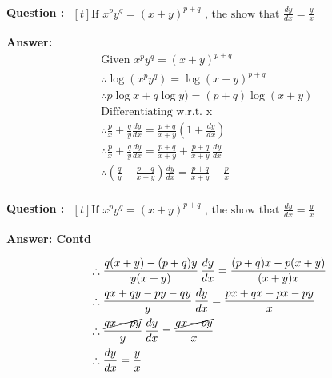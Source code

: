 \documentclass{beamer}
\begin{document}
\frame
{ \textbf{Question :} 
$\begin{aligned}[t] 
\text{If \ } x^p y^q = (x+y)^{p+q} \text{\ , \ the show that \ \  } \frac{dy}{dx}=\frac{y}{x}
\end{aligned}$

\textbf{Answer:}
\begin{equation} \nonumber
\begin{alignedat}{4}
& \text{Given \ } x^py^q = (x+y)^{p+q} \\
& \therefore \log (x^py^q) = \log (x+y)^{p+q} \\
& \therefore p\log x + q\log y) = (p+q)\log (x+y) \\
& \text{Differentiating w.r.t. x \ }\\
& \therefore \frac{p}{x}+\frac{q}{y}\frac{dy}{dx} = \frac{p+q}{x+y}\left( 1+\frac{dy}{dx}\right)\\
& \therefore \frac{p}{x}+\frac{q}{y}\frac{dy}{dx} = \frac{p+q}{x+y} + \frac{p+q}{x+y}\,\frac{dy}{dx}\\
& \therefore \left( \frac{q}{y}-\frac{p+q}{x+y} \right)  \frac{dy}{dx} = \frac{p+q}{x+y} - \frac{p}{x}\\
\end{alignedat}
\,
\begin{alignedat}{4}
\end{alignedat}
\end{equation}


}



\frame
{ \textbf{Question :} 
$\begin{aligned}[t] 
\text{If \ } x^p y^q = (x+y)^{p+q} \text{\ , \ the show that \ \  } \frac{dy}{dx}=\frac{y}{x}
\end{aligned}$

\textbf{Answer: Contd}

\begin{equation} \nonumber
\begin{alignedat}{4}
& \therefore \frac{q(x+y) - (p+q)y}{y(x+y)} \,  \frac{dy}{dx} = \frac{(p+q)x - p(x+y)}{(x+y)x}\\
& \therefore \frac{qx + qy - py - qy}{y} \,  \frac{dy}{dx} = \frac{px + qx - px - py}{x}\\
& \therefore \frac{\cancel{qx - py}}{y} \,  \frac{dy}{dx} =  \frac{\cancel{qx - py}}{x}\\
& \therefore \frac{dy}{dx}=\frac{y}{x}\\
& \\
& \\
& \\
& \\
& \\
& \\
\end{alignedat}
\end{equation}

}

\end{document}
